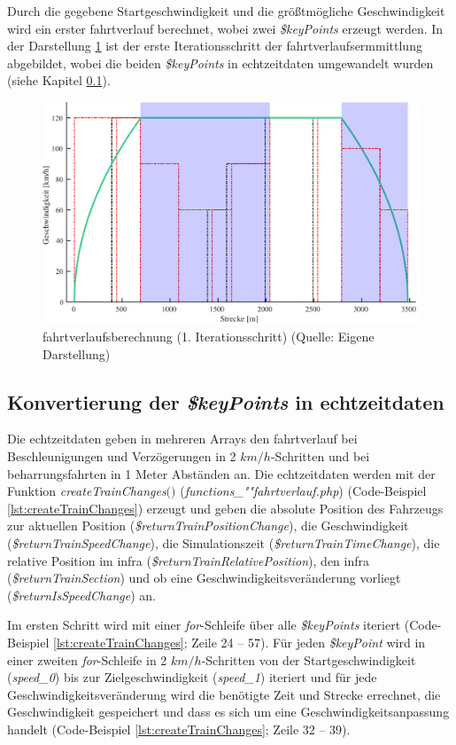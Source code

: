 Durch die gegebene Startgeschwindigkeit und die größtmögliche Geschwindigkeit wird ein erster \Gls{fahrtverlauf} berechnet, wobei zwei \textit{\$keyPoints} erzeugt werden. In der Darstellung \ref{fig:it3} ist der erste Iterationsschritt der \Gls{fahrtverlauf}sermmittlung abgebildet, wobei die beiden \textit{\$keyPoints} in \Gls{echtzeitdaten} umgewandelt wurden (siehe Kapitel \ref{keypointumwandlung}).
\begin{figure}
\includegraphics[width=\linewidth]{../images/matlab/it3.pdf}
\caption[\Gls{fahrtverlauf}sberechnung (1. Iterationsschritt)]{\Gls{fahrtverlauf}sberechnung (1. Iterationsschritt) (Quelle: Eigene Darstellung)}
\label{fig:it3}
\end{figure}
\subsection{Konvertierung der \textit{\$keyPoints} in \Gls{echtzeitdaten}} \label{keypointumwandlung}
Die \Gls{echtzeitdaten} geben in mehreren Arrays den \Gls{fahrtverlauf} bei Beschleunigungen und Verzögerungen in 2 $km/h$-Schritten und bei \Gls{beharrungsfahrt}en in 1 Meter Abständen an. Die \Gls{echtzeitdaten} werden mit der Funktion \textit{createTrainChanges$($$)$} (\textit{func\-tions\_""fahrt\-ver\-lauf.php}) (Code-Beispiel \ref{lst:createTrainChanges}) erzeugt und geben die absolute Position des Fahrzeugs zur aktuellen Position (\textit{\$returnTrainPositionChange}), die Geschwindigkeit (\textit{\$returnTrainSpeedChange}), die Simulationszeit (\textit{\$returnTrainTimeChange}), die relative Position im \ac{infra} (\textit{\$returnTrainRelativePosition}), den \ac{infra} (\textit{\$returnTrainSection}) und ob eine Geschwindigkeitsveränderung vorliegt (\textit{\$return\-Is\-SpeedChange}) an.

Im ersten Schritt wird mit einer \textit{for}-Schleife über alle \textit{\$keyPoints} iteriert (Code-Beispiel \ref{lst:createTrainChanges}; Zeile 24 -- 57). Für jeden \textit{\$keyPoint} wird in einer zweiten \textit{for}-Schleife in 2 $km/h$-Schritten von der Startgeschwindigkeit (\textit{speed\_0}) bis zur Zielgeschwindigkeit (\textit{speed\_1}) iteriert und für jede Geschwindigkeitsveränderung wird die benötigte Zeit und Strecke errechnet, die Geschwindigkeit gespeichert und dass es sich um eine Geschwindigkeitsanpassung handelt (Code-Beispiel \ref{lst:createTrainChanges}; Zeile 32 -- 39). 

